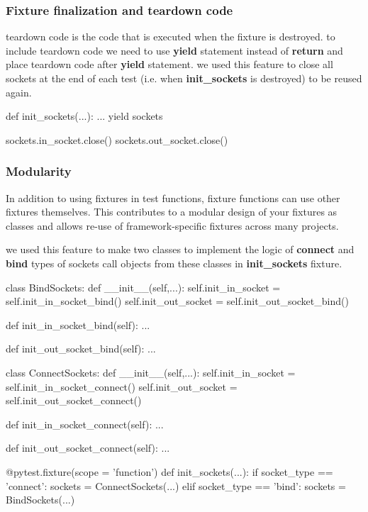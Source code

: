 \subsubsection{Fixture finalization and teardown code}
teardown code is the code that is executed when the fixture is destroyed. to include teardown code we need to use \textbf{yield} statement instead of \textbf{return} and place teardown code after \textbf{yield} statement. we used this feature to close all sockets at the end of each test (i.e. when \textbf{init\_sockets} is destroyed) to be reused again.

\begin{python}
def init_sockets(...):
    ...
    yield sockets
    
    sockets.in_socket.close()
    sockets.out_socket.close()
\end{python}

\subsubsection{Modularity}
In addition to using fixtures in test functions, fixture functions can use other fixtures themselves. This contributes to a modular design of your fixtures as classes and allows re-use of framework-specific fixtures across many projects.

we used this feature to make two classes to implement the logic of \textbf{connect} and \textbf{bind} types of sockets call objects from these classes in \textbf{init\_sockets} fixture.


\begin{python}
class BindSockets:
    def __init__(self,...):
        self.init_in_socket = self.init_in_socket_bind()
        self.init_out_socket = self.init_out_socket_bind()
    
    def init_in_socket_bind(self):
        ...

    def init_out_socket_bind(self):
        ...

class ConnectSockets:
    def __init__(self,...):
        self.init_in_socket = self.init_in_socket_connect()
        self.init_out_socket = self.init_out_socket_connect()
    
    def init_in_socket_connect(self):
        ...

    def init_out_socket_connect(self):
        ...
    
@pytest.fixture(scope = 'function')
def init_sockets(...):
    if socket_type == 'connect':
        sockets = ConnectSockets(...)
    elif socket_type == 'bind':
        sockets = BindSockets(...)
    
\end{python}
